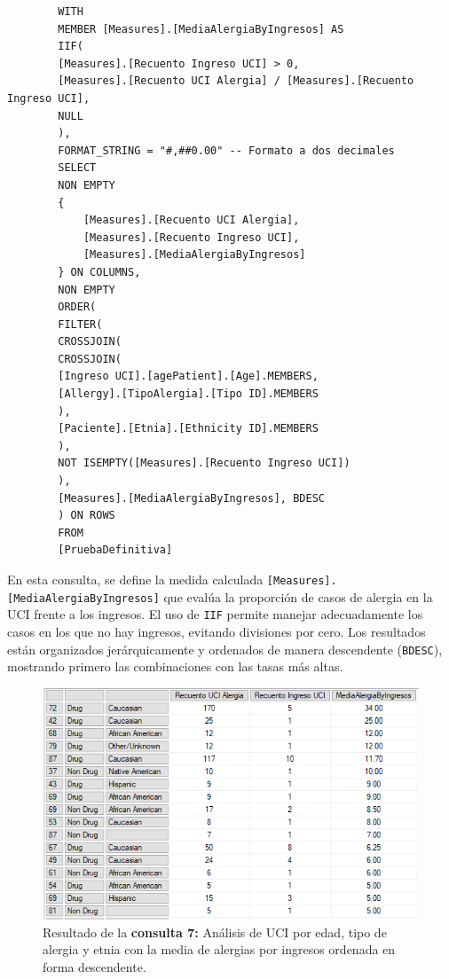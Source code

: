\documentclass[12pt, a4paper, twoside]{article}
\begin{document}
	
	\begin{verbatim}
		WITH 
		MEMBER [Measures].[MediaAlergiaByIngresos] AS 
		IIF(
		[Measures].[Recuento Ingreso UCI] > 0, 
		[Measures].[Recuento UCI Alergia] / [Measures].[Recuento Ingreso UCI], 
		NULL
		), 
		FORMAT_STRING = "#,##0.00" -- Formato a dos decimales
		SELECT 
		NON EMPTY 
		{ 
			[Measures].[Recuento UCI Alergia],
			[Measures].[Recuento Ingreso UCI],
			[Measures].[MediaAlergiaByIngresos]
		} ON COLUMNS,    
		NON EMPTY 
		ORDER(
		FILTER(
		CROSSJOIN(
		CROSSJOIN(
		[Ingreso UCI].[agePatient].[Age].MEMBERS, 
		[Allergy].[TipoAlergia].[Tipo ID].MEMBERS
		), 
		[Paciente].[Etnia].[Ethnicity ID].MEMBERS
		),
		NOT ISEMPTY([Measures].[Recuento Ingreso UCI])
		),
		[Measures].[MediaAlergiaByIngresos], BDESC
		) ON ROWS
		FROM 
		[PruebaDefinitiva]
	\end{verbatim}
	
	En esta consulta, se define la medida calculada \texttt{[Measures].[MediaAlergiaByIngresos]} que evalúa la proporción de casos de alergia en la UCI frente a los ingresos. El uso de \texttt{IIF} permite manejar adecuadamente los casos en los que no hay ingresos, evitando divisiones por cero. Los resultados están organizados jerárquicamente y ordenados de manera descendente (\texttt{BDESC}), mostrando primero las combinaciones con las tasas más altas.
	
	\begin{figure}[H]
		\centering
		\includegraphics[width=1\textwidth]{image/consulta7.png}
		\caption{Resultado de la \textbf{consulta 7:} Análisis de UCI por edad, tipo de alergia y etnia con la media de alergias por ingresos ordenada en forma descendente.}
		\label{fig:consulta7}
	\end{figure}
	
\end{document}
